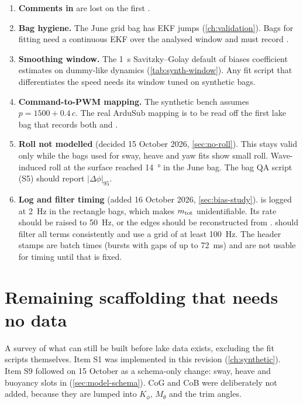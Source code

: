 \begin{enumerate}
        ($\phi_0$ is no longer needed, since roll is not modelled).
  \item \textbf{Comments in } are lost on the first .
  \item \textbf{Bag hygiene.} The June grid bag has EKF jumps (\cref{ch:validation}). Bags for fitting
        need a continuous EKF over the analysed window and must record .
  \item \textbf{Smoothing window.} The \qty{1}{\second} Savitzky--Golay default of
         biases coefficient estimates on dummy-like dynamics
        (\cref{tab:synth-window}). Any fit script that differentiates the speed needs its window
        tuned on synthetic bags.
  \item \textbf{Command-to-PWM mapping.} The synthetic bench assumes
        $p = 1500 + 0.4\,c$. The real ArduSub mapping is to be read off the first lake bag that
        records both  and .
  \item \textbf{Roll not modelled} (decided 15 October 2026, \cref{sec:no-roll}). This stays
        valid only while the bags used for sway, heave and yaw fits show small roll. Wave-induced
        roll at the surface reached \qty{14}{\degree} in the June bag. The bag QA script (S5)
        should report $|\Delta\phi|_{95}$.
  \item \textbf{Log and filter timing} (added 16 October 2026, \cref{sec:bias-study}).
         is logged at \qty{2}{\hertz} in the rectangle bags, which makes
        $m_\mathrm{tot}$ unidentifiable. Its rate should be raised to \qty{50}{\hertz}, or the edges should
        be reconstructed from .  should filter all terms
        consistently and use a grid of at least \qty{100}{\hertz}. The  header
        stamps are batch times (bursts with gaps of up to \qty{72}{\milli\second}) and are not
        usable for timing until that is fixed.
\end{enumerate}

\section{Remaining scaffolding that needs no data}
\label{sec:scaffolding}

\begin{revised}[title={New section, added 14 October 2026}]
A survey of what can still be built before lake data exists, excluding the fit scripts
themselves. Item S1 was implemented in this revision (\cref{ch:synthetic}). Item S9 followed
on 15 October as a schema-only change: sway, heave and buoyancy slots in 
(\cref{sec:model-schema}). CoG and CoB were deliberately not added, because they are lumped
into $K_\phi$, $M_\theta$ and the trim angles.
\end{revised}

